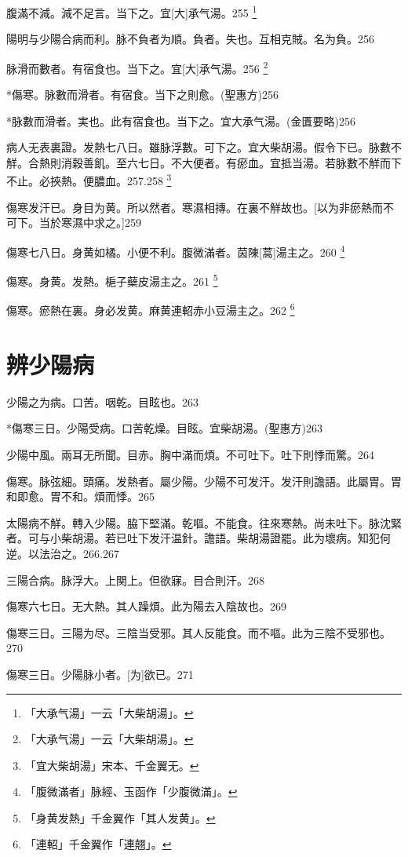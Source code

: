 \documentclass[12pt,oneside,UTF8,b5paper]{ctexbook}她她她她她她她
\begin{document}
腹滿不減。減不足言。当下之。宜[大]承气湯。255
	\footnote{「大承气湯」一云「大柴胡湯」。}

陽明与少陽合病而利。脉不負者为順。負者。失也。互相克賊。名为負。256

脉滑而數者。有宿食也。当下之。宜[大]承气湯。256
	\footnote{「大承气湯」一云「大柴胡湯」。}

*傷寒。脉數而滑者。有宿食。当下之則愈。(聖惠方)256

*脉數而滑者。実也。此有宿食也。当下之。宜大承气湯。(金匱要略)256

病人无表裏證。发熱七八日。雖脉浮數。可下之。宜大柴胡湯。假令下已。脉數不觧。合熱則消穀善飢。至六七日。不大便者。有瘀血。宜抵当湯。若脉數不觧而下不止。必挾熱。便膿血。257.258
	\footnote{「宜大柴胡湯」宋本、千金翼无。}

傷寒发汗已。身目为黄。所以然者。寒濕相摶。在裏不觧故也。[以为非瘀熱而不可下。当於寒濕中求之。]259

傷寒七八日。身黄如橘。小便不利。腹微滿者。茵陳[蒿]湯主之。260
	\footnote{「腹微滿者」脉經、玉函作「少腹微滿」。}

傷寒。身黄。发熱。梔子蘗皮湯主之。261
	\footnote{「身黄发熱」千金翼作「其人发黄」。}

傷寒。瘀熱在裏。身必发黄。麻黄連軺赤小豆湯主之。262
	\footnote{「連軺」千金翼作「連翹」。}

\chapter{辨少陽病}

少陽之为病。口苦。咽乾。目眩也。263

*傷寒三日。少陽受病。口苦乾燥。目眩。宜柴胡湯。(聖惠方)263

少陽中風。兩耳无所聞。目赤。胸中滿而煩。不可吐下。吐下則悸而驚。264

傷寒。脉弦細。頭痛。发熱者。屬少陽。少陽不可发汗。发汗則譫語。此屬胃。胃和即愈。胃不和。煩而悸。265

太陽病不觧。轉入少陽。脇下堅滿。乾嘔。不能食。往來寒熱。尚未吐下。脉沈緊者。可与小柴胡湯。若已吐下发汗温針。譫語。柴胡湯證罷。此为壞病。知犯何逆。以法治之。266.267

三陽合病。脉浮大。上関上。但欲寐。目合則汗。268

傷寒六七日。无大熱。其人躁煩。此为陽去入陰故也。269

傷寒三日。三陽为尽。三陰当受邪。其人反能食。而不嘔。此为三陰不受邪也。270

傷寒三日。少陽脉小者。[为]欲已。271
\end{document}

